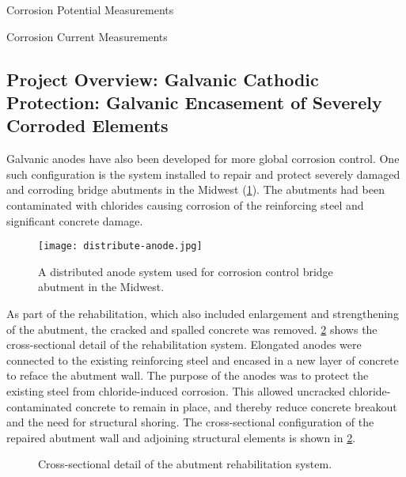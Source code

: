 \begin{table}
  \caption{Corrosion Potential Measurements}
  \label{tab:corrosion-potential-measurements}
\end{table}

\begin{table}
  \caption{Corrosion Current Measurements}
  \label{tab:corrosion-current-measurements}
\end{table}

\subsection{Project Overview: Galvanic Cathodic Protection: Galvanic Encasement of Severely Corroded Elements}
Galvanic anodes have also been developed for more global corrosion control. One such configuration is the system installed to repair and protect severely damaged and corroding bridge abutments in the Midwest (\cref{fig:distribute-anode}). The abutments had been contaminated with chlorides causing corrosion of the reinforcing steel and significant concrete damage.

\begin{figure}
  \texttt{[image: distribute-anode.jpg]}
  \caption{A distributed anode system used for corrosion control bridge abutment in the Midwest.}
  \label{fig:distribute-anode}
\end{figure}

As part of the rehabilitation, which also included enlargement and strengthening of the abutment, the cracked and spalled concrete was removed. \cref{fig:abutment-section-rehabilitation} shows the cross-sectional detail of the rehabilitation system. Elongated anodes were connected to the existing reinforcing steel and encased in a new layer of concrete to reface the abutment wall. The purpose of the anodes was to protect the existing steel from chloride-induced corrosion. This allowed uncracked chloride-contaminated concrete to remain in place, and thereby reduce concrete breakout and the need for structural shoring. The cross-sectional configuration of the repaired abutment wall and adjoining structural elements is shown in \cref{fig:abutment-section-rehabilitation}.

\begin{figure}
  \caption{Cross-sectional detail of the abutment rehabilitation system.}\label{fig:abutment-section-rehabilitation}
\end{figure}

